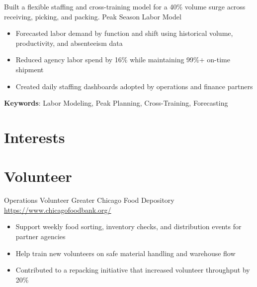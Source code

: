 \documentclass[a4paper, serif, 10pt]{moderncv}
\begin{document}
        {Built a flexible staffing and cross-training model for a 40\% volume surge across receiving, picking, and packing.}
        {Peak Season Labor Model}
        {}
        {}
        {\begin{itemize}
\item Forecasted labor demand by function and shift using historical volume, productivity, and absenteeism data
\item Reduced agency labor spend by 16\% while maintaining 99\%+ on-time shipment
\item Created daily staffing dashboards adopted by operations and finance partners
\end{itemize}
\textbf{Keywords}: Labor Modeling, Peak Planning, Cross-Training, Forecasting}
\section{Interests}

\section{Volunteer}

        {Operations Volunteer}
        {Greater Chicago Food Depository}
        {\url{https://www.chicagofoodbank.org/}}
        {}
        {\begin{itemize}
\item Support weekly food sorting, inventory checks, and distribution events for partner agencies
\item Help train new volunteers on safe material handling and warehouse flow
\item Contributed to a repacking initiative that increased volunteer throughput by 20\%
\end{itemize}}
    
\end{document}
